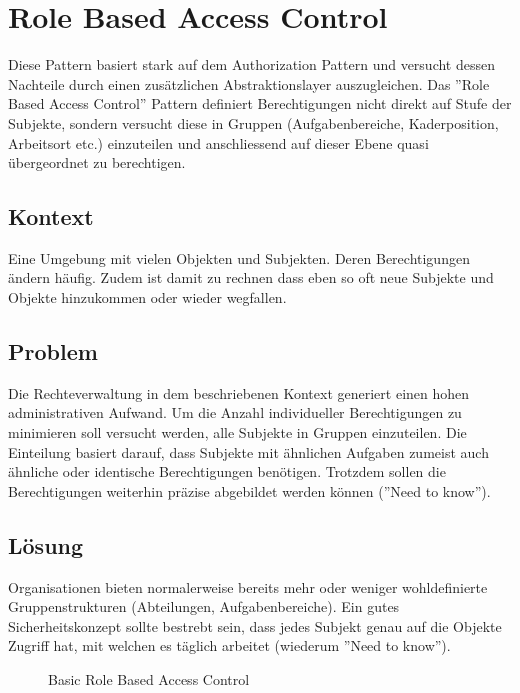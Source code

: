 \section{Role Based Access Control}
\label{sec:rbac}

Diese Pattern basiert stark auf dem Authorization Pattern und versucht dessen Nachteile durch einen zusätzlichen Abstraktionslayer auszugleichen.
Das ''Role Based Access Control'' Pattern definiert Berechtigungen nicht direkt auf Stufe der Subjekte, sondern versucht diese in Gruppen (Aufgabenbereiche, Kaderposition, Arbeitsort etc.) einzuteilen und anschliessend auf dieser Ebene quasi übergeordnet zu berechtigen.

\subsection*{Kontext}
Eine Umgebung mit vielen Objekten und Subjekten. Deren Berechtigungen ändern häufig. Zudem ist damit zu rechnen dass eben so oft neue Subjekte und Objekte hinzukommen oder wieder wegfallen.

\subsection*{Problem}
Die Rechteverwaltung in dem beschriebenen Kontext generiert einen hohen administrativen Aufwand. Um die Anzahl individueller Berechtigungen zu minimieren soll versucht werden, alle Subjekte in Gruppen einzuteilen. Die Einteilung basiert darauf, dass Subjekte mit ähnlichen Aufgaben zumeist auch ähnliche oder identische Berechtigungen benötigen.
Trotzdem sollen die Berechtigungen weiterhin präzise abgebildet werden können (''Need to know'').

\subsection*{Lösung}
Organisationen bieten normalerweise bereits mehr oder weniger wohldefinierte Gruppenstrukturen (Abteilungen, Aufgabenbereiche).
Ein gutes Sicherheitskonzept sollte bestrebt sein, dass jedes Subjekt genau auf die Objekte Zugriff hat, mit welchen es täglich arbeitet (wiederum ''Need to know'').

\begin{figure}[H]
	\begin{center}
	\end{center}
	\caption{Basic Role Based Access Control}
\end{figure}

